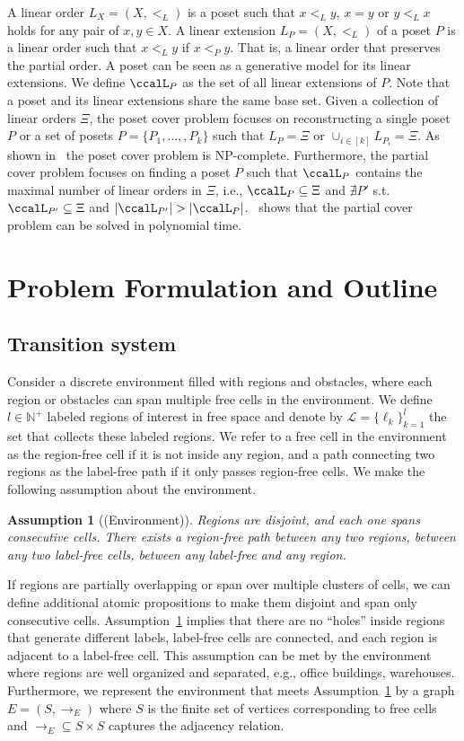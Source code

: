 \documentclass[Afour,sageh,times]{sagej}
\newtheorem{asmp}[thm]{Assumption}
\begin{document}
A linear order $L_X=(X, <_L)$ is a poset such that $x <_L y$, $x = y$ or $y <_L x$ holds for any pair of  $x, y \in X$. A linear extension  $L_P = (X, <_L)$ of a poset $P$ is a linear order such that $x <_L y$ if $x <_P y$. That is, a linear order that preserves the partial order. A poset can be seen as a generative model for its linear extensions.
We define $\ccalL_P$ as the set of all linear extensions of $P$. Note that a poset and its linear extensions share the same base set. Given a collection of linear orders $\Xi$, the poset cover problem focuses on reconstructing a single poset $P$ or a set of posets $P = \{P_1,\ldots,,P_k\}$ such that $L_P = \Xi$ or $\cup_{i\in[k]}L_{P_i} = \Xi$. As shown in~\cite{heath2013poset} the poset cover problem is NP-complete. Furthermore, the partial cover problem focuses on finding a poset $P$ such that $\ccalL_P$ contains the maximal number of linear orders in $\Xi$, i.e., $\ccalL_P \subseteq \Xi$ and   $\nexists P'$ s.t. $\ccalL_{P'} \subseteq \Xi$ and $|\ccalL_{P'}| > |\ccalL_{P}|$.~\cite{heath2013poset} shows that the partial cover problem can be solved in polynomial time.



\section{Problem Formulation and Outline}\label{sec:problem}
\subsection{Transition system}\label{sec:ts}
Consider a discrete environment filled with regions and obstacles, where each region or obstacles can span multiple free cells in the environment. We define $l\in \mathbb{N}^+$ labeled regions of interest in free space and denote by $\mathcal{L}=\{\ell_k\}_{k=1}^{l}$ the set that collects these labeled regions.  We refer to a free cell in the environment as the region-free cell if it is not inside any region, and a path connecting two regions as the label-free path if it only passes region-free cells. We make the following assumption about the environment.
 \begin{asmp}[(Environment)]\label{asmp:env}
 Regions are disjoint, and each one spans consecutive cells. There exists a region-free path between any two regions, between any two label-free cells, between any label-free and any region.
 \end{asmp}
 If regions are partially overlapping or span over multiple clusters of cells, we can define additional atomic propositions to make them disjoint and span only consecutive cells.  Assumption~\ref{asmp:env} implies that there are no ``holes'' inside regions that generate different labels, label-free cells are connected, and each region is adjacent to a label-free cell. This assumption can be met by the environment where regions are well organized and separated, e.g., office buildings, warehouses. Furthermore, we represent the environment that meets Assumption~\ref{asmp:env} by a graph $E = (S, \to_E)$ where $S$ is the finite set of vertices corresponding to free cells and $\to_{E} \subseteq S \times S$ captures the adjacency relation.
\end{document}

